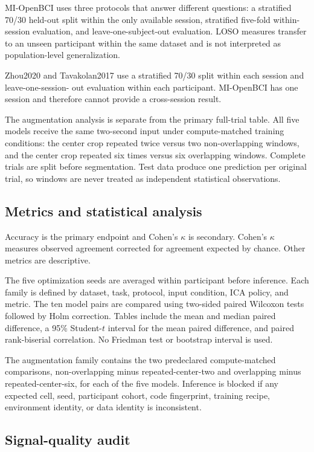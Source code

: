 \documentclass[conference]{IEEEtran}
\begin{document}
MI-OpenBCI uses three protocols that answer different questions: a stratified 70/30 held-out split
within the only available session, stratified five-fold within-session evaluation, and
leave-one-subject-out evaluation. LOSO measures transfer to an unseen participant within the same
dataset and is not interpreted as population-level generalization.

Zhou2020 and Tavakolan2017 use a stratified 70/30 split within each session and leave-one-session-
out evaluation within each participant. MI-OpenBCI has one session and therefore cannot provide a
cross-session result.

The augmentation analysis is separate from the primary full-trial table. All five models receive
the same two-second input under compute-matched training conditions: the center crop repeated twice
versus two non-overlapping windows, and the center crop repeated six times versus six overlapping
windows. Complete trials are split before segmentation. Test data produce one prediction per
original trial, so windows are never treated as independent statistical observations.

\subsection{Metrics and statistical analysis}

Accuracy is the primary endpoint and Cohen's $\kappa$ is secondary. Cohen's $\kappa$ measures
observed agreement corrected for agreement expected by chance. Other metrics are descriptive.

The five optimization seeds are averaged within participant before inference. Each family is
defined by dataset, task, protocol, input condition, ICA policy, and metric. The ten model pairs are
compared using two-sided paired Wilcoxon tests followed by Holm correction. Tables include the mean
and median paired difference, a 95\% Student-$t$ interval for the mean paired difference, and paired
rank-biserial correlation. No Friedman test or bootstrap interval is used.

The augmentation family contains the two predeclared compute-matched comparisons,
non-overlapping minus repeated-center-two and overlapping minus repeated-center-six, for each of
the five models. Inference is blocked if any expected cell, seed, participant cohort, code
fingerprint, training recipe, environment identity, or data identity is inconsistent.

\subsection{Signal-quality audit}
\end{document}
